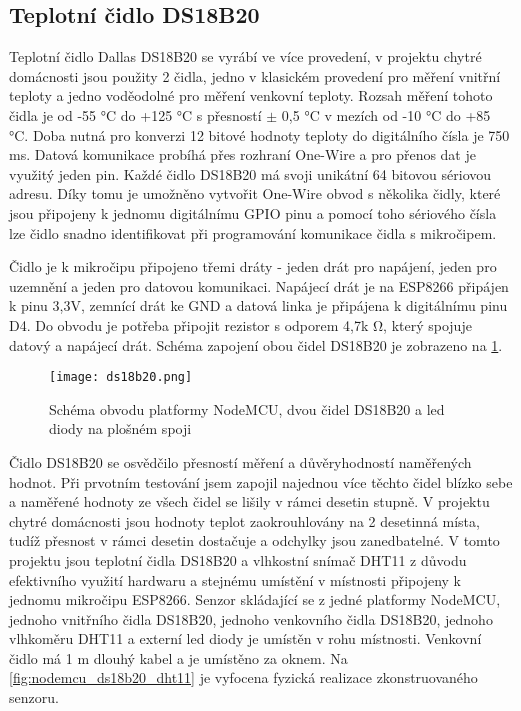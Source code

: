 \subsection{Teplotní čidlo DS18B20}
Teplotní čidlo Dallas DS18B20 se vyrábí ve více provedení, v projektu chytré domácnosti jsou použity 2 čidla, jedno v klasickém provedení pro měření vnitřní teploty a jedno voděodolné pro měření venkovní teploty. Rozsah měření tohoto čidla je od -55 \si{\degree}C do +125 \si{\degree}C s přesností $\pm$ 0,5 \si{\degree}C v mezích od -10 \si{\degree}C do +85 \si{\degree}C. Doba nutná pro konverzi 12 bitové hodnoty teploty do digitálního čísla je 750 ms. Datová komunikace probíhá přes rozhraní One-Wire a pro přenos dat je využitý jeden pin. Každé čidlo DS18B20 má svoji unikátní 64 bitovou sériovou adresu. Díky tomu je umožněno vytvořit One-Wire obvod s několika čidly, které jsou připojeny k jednomu digitálnímu GPIO pinu a pomocí toho sériového čísla lze čidlo snadno identifikovat při programování komunikace čidla s mikročipem. \par
Čidlo je k mikročipu připojeno třemi dráty - jeden drát pro napájení, jeden pro uzemnění a jeden pro datovou komunikaci. Napájecí drát je na ESP8266 připájen k pinu 3,3V, zemnící drát ke GND a datová linka je připájena k digitálnímu pinu D4. Do obvodu je potřeba připojit rezistor s odporem 4,7k \si{\ohm}, který spojuje datový a napájecí drát. Schéma zapojení obou čidel DS18B20 je zobrazeno na \cref{fig:schema_esp_ds18b20}.\par

\begin{figure}[H]
  \centering
  \texttt{[image: ds18b20.png]}
  \caption{Schéma obvodu platformy NodeMCU, dvou čidel DS18B20 a led diody na plošném spoji}
  \label{fig:schema_esp_ds18b20}
\end{figure}

Čidlo DS18B20 se osvědčilo přesností měření a důvěryhodností naměřených hodnot. Při prvotním testování jsem zapojil najednou více těchto čidel blízko sebe a naměřené hodnoty ze všech čidel se lišily v rámci desetin stupně. V projektu chytré domácnosti jsou hodnoty teplot zaokrouhlovány na 2 desetinná místa, tudíž přesnost v rámci desetin dostačuje a odchylky jsou zanedbatelné. V tomto projektu jsou teplotní čidla DS18B20 a vlhkostní snímač DHT11 z důvodu efektivního využití hardwaru a stejnému umístění v místnosti připojeny k jednomu mikročipu ESP8266. Senzor skládající se z jedné platformy NodeMCU, jednoho vnitřního čidla DS18B20, jednoho venkovního čidla DS18B20, jednoho vlhkoměru DHT11 a externí led diody je umístěn v rohu místnosti. Venkovní čidlo má 1 m dlouhý kabel a je umístěno za oknem. Na \cref{fig:nodemcu_ds18b20_dht11} je vyfocena fyzická realizace zkonstruovaného senzoru.

